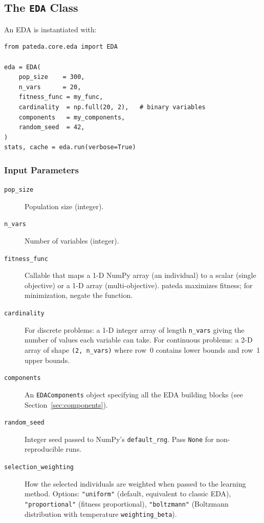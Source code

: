 \documentclass[a4paper,11pt]{article}
\begin{document}
\subsection{The \texttt{EDA} Class}

An EDA is instantiated with:

\begin{lstlisting}
from pateda.core.eda import EDA

eda = EDA(
    pop_size    = 300,
    n_vars      = 20,
    fitness_func = my_func,
    cardinality  = np.full(20, 2),   # binary variables
    components   = my_components,
    random_seed  = 42,
)
stats, cache = eda.run(verbose=True)
\end{lstlisting}

\subsubsection{Input Parameters}

\begin{description}
  \item[\texttt{pop\_size}] Population size (integer).
  \item[\texttt{n\_vars}] Number of variables (integer).
  \item[\texttt{fitness\_func}] Callable that maps a 1-D NumPy array (an
    individual) to a scalar (single objective) or a 1-D array (multi-objective).
    pateda maximizes fitness; for minimization, negate the function.
  \item[\texttt{cardinality}] For discrete problems: a 1-D integer array of
    length \texttt{n\_vars} giving the number of values each variable can take.
    For continuous problems: a 2-D array of shape
    \texttt{(2, n\_vars)} where row~0 contains lower bounds and row~1 upper bounds.
  \item[\texttt{components}] An \texttt{EDAComponents} object specifying all
    the EDA building blocks (see Section~\ref{sec:components}).
  \item[\texttt{random\_seed}] Integer seed passed to NumPy's
    \texttt{default\_rng}.  Pass \texttt{None} for non-reproducible runs.
  \item[\texttt{selection\_weighting}] How the selected individuals are weighted
    when passed to the learning method.  Options: \texttt{"uniform"} (default,
    equivalent to classic EDA), \texttt{"proportional"} (fitness proportional),
    \texttt{"boltzmann"} (Boltzmann distribution with temperature
    \texttt{weighting\_beta}).
\end{description}
\end{document}
